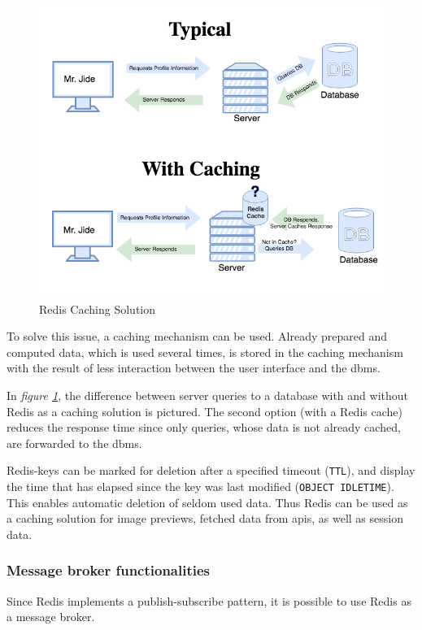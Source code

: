 \begin{figure}[h]
\includegraphics[width=12cm]{img/redis_caching.png}
\centering
\caption{Redis Caching Solution \parencite{redis:img:1}}
\label{fig:redisCaching}
\end{figure}

To solve this issue, a caching mechanism can be used. Already prepared and
computed data, which is used several times, is stored in the caching mechanism
with the result of less interaction between the user interface and the
\gls{dbms}.

In \textit{figure \ref{fig:redisCaching}}, the difference between server queries
to a database with and without Redis as a caching solution is pictured. The
second option (with a Redis cache) reduces the response time since only queries,
whose data is not already cached, are forwarded to the \gls{dbms}.

Redis-keys can be marked for deletion after a specified timeout (\texttt{TTL}),
and display the time that has elapsed since the key was last modified
(\texttt{OBJECT IDLETIME}). This enables automatic deletion of seldom used
data.  Thus Redis can be used as a caching solution for image previews, fetched
data from \acrshort{api}s, as well as session data. \parencite{redis:commands}

\subsubsection{Message broker functionalities}
Since Redis implements a publish-subscribe pattern, it is possible to use Redis
as a message broker.


